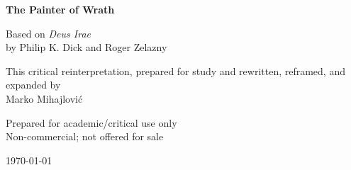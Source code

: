 \begin{titlepage}
\centering

{\Huge\bfseries The Painter of Wrath\par}

\vspace{1.5cm}

{\Large
Based on \emph{Deus Irae}\\
by Philip K. Dick and Roger Zelazny\par
}

\vspace{1.75cm}

{\Large
This critical reinterpretation, prepared for study and rewritten, reframed, and expanded by\\
Marko Mihajlovi\'c\par
}

\vspace{0.75cm}

{\large
Prepared for academic/critical use only\\
Non-commercial; not offered for sale\par
}

\vfill

{\large \today\par}

\end{titlepage}
\clearpage
